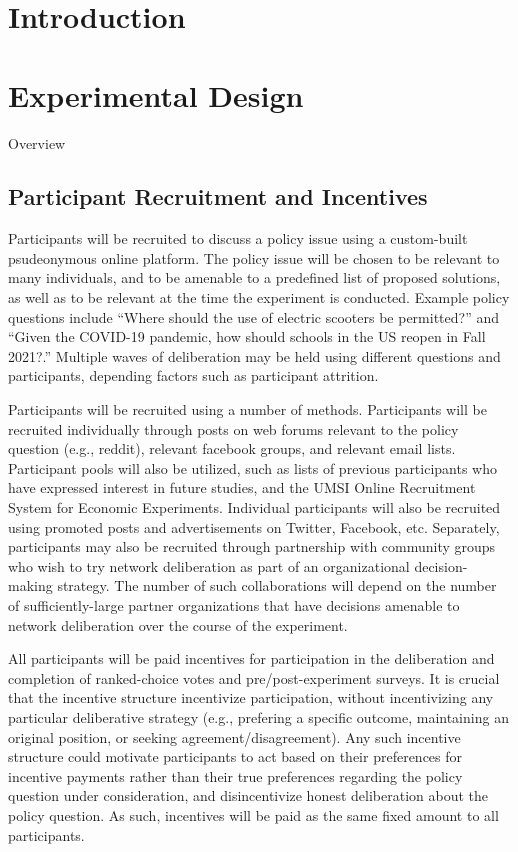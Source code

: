 \section{Introduction}

\section{Experimental Design}
Overview

\subsection{Participant Recruitment and Incentives}
Participants will be recruited to discuss a policy issue
using a custom-built psudeonymous online platform.
The policy issue will be chosen to be relevant to many individuals,
and to be amenable to a predefined list of proposed solutions,
as well as to be relevant at the time the experiment is conducted.
Example policy questions include
``Where should the use of electric scooters be permitted?'' and
``Given the COVID-19 pandemic, how should schools in the US reopen in Fall 2021?.''
Multiple waves of deliberation may be held using different questions and participants,
depending factors such as participant attrition.

Participants will be recruited using a number of methods.
Participants will be recruited individually through posts on web forums
relevant to the policy question (e.g., reddit),
relevant facebook groups,
and relevant email lists.
Participant pools will also be utilized,
such as lists of previous participants who have expressed interest in future
studies,
and the UMSI Online Recruitment System for Economic Experiments.
Individual participants will also be recruited using promoted posts and
advertisements on Twitter, Facebook, etc.
Separately, participants may also be recruited through partnership with
community groups who wish to try network deliberation as part of an organizational
decision-making strategy.
The number of such collaborations will depend on the number of sufficiently-large
partner organizations that have decisions amenable to network deliberation
over the course of the experiment.

All participants will be paid incentives for participation in the deliberation
and completion of ranked-choice votes and pre/post-experiment surveys.
It is crucial that the incentive structure incentivize participation,
without incentivizing any particular deliberative strategy
(e.g., prefering a specific outcome, maintaining an original position, or
seeking agreement/disagreement).
Any such incentive structure could motivate participants to act based on their
preferences for incentive payments rather than their true preferences regarding
the policy question under consideration,
and disincentivize honest deliberation about the policy question.
As such, incentives will be paid as the same fixed amount to all participants.

